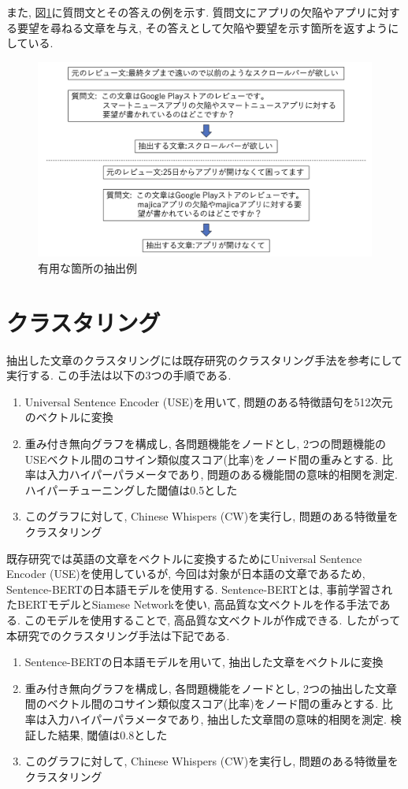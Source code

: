 また, 図\ref{chap:answer}に質問文とその答えの例を示す. 質問文にアプリの欠陥やアプリに対する要望を尋ねる文章を与え, その答えとして欠陥や要望を示す箇所を返すようにしている. 
\begin{figure}[hbtp]
  \centering
  \includegraphics[scale=0.4]
       {contents/images/answer.png}
  \caption{有用な箇所の抽出例\label{chap:answer}}
\end{figure}


\section{クラスタリング}
抽出した文章のクラスタリングには既存研究のクラスタリング手法\cite{sira}を参考にして実行する. この手法は以下の3つの手順である. 
\begin{enumerate}
  \item Universal Sentence Encoder (USE)を用いて, 問題のある特徴語句を512次元のベクトルに変換
  \item 重み付き無向グラフを構成し, 各問題機能をノードとし, 2つの問題機能のUSEベクトル間のコサイン類似度スコア(比率)をノード間の重みとする. 比率は入力ハイパーパラメータであり, 問題のある機能間の意味的相関を測定. ハイパーチューニングした閾値は0.5とした
  \item このグラフに対して, Chinese Whispers (CW)を実行し, 問題のある特徴量をクラスタリング
\end{enumerate}

既存研究では英語の文章をベクトルに変換するためにUniversal Sentence Encoder (USE)を使用しているが, 今回は対象が日本語の文章であるため, Sentence-BERTの日本語モデルを使用する. Sentence-BERTとは, 事前学習されたBERTモデルとSiamese Networkを使い, 高品質な文ベクトルを作る手法である. このモデルを使用することで, 高品質な文ベクトルが作成できる. 
したがって本研究でのクラスタリング手法は下記である. 
\begin{enumerate}
  \item Sentence-BERTの日本語モデルを用いて, 抽出した文章をベクトルに変換
  \item 重み付き無向グラフを構成し, 各問題機能をノードとし, 2つの抽出した文章間のベクトル間のコサイン類似度スコア(比率)をノード間の重みとする. 比率は入力ハイパーパラメータであり, 抽出した文章間の意味的相関を測定. 検証した結果, 閾値は0.8とした
  \item このグラフに対して, Chinese Whispers (CW)を実行し, 問題のある特徴量をクラスタリング
\end{enumerate}

